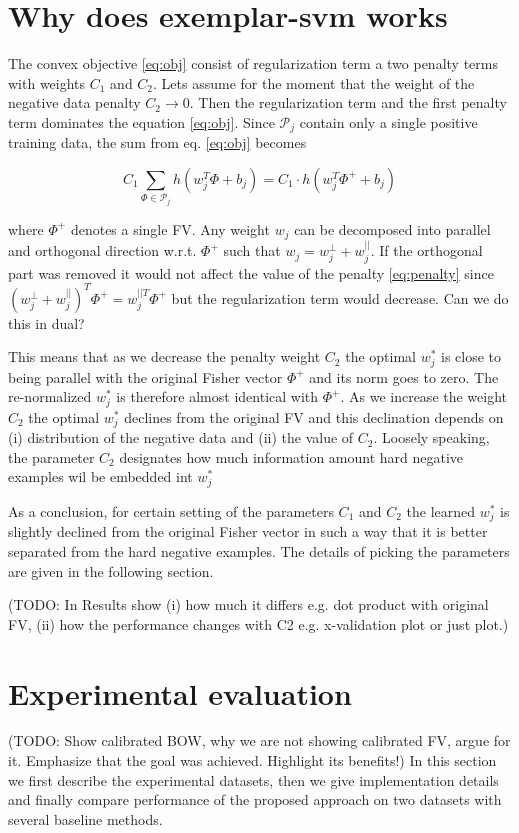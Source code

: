 \documentclass[table]{article} %
\begin{document}
\section{Why does exemplar-svm works}
  	The convex objective \eqref{eq:obj} consist of regularization term a two penalty terms with weights $C_1$ and $C_2$. Lets assume for the moment that the weight of the negative data penalty $C_2 \rightarrow 0$. Then the regularization term and the first penalty term dominates the equation \eqref{eq:obj}. Since $\mathcal P_j$ contain only a single positive training data, the sum from eq. \eqref{eq:obj} becomes

  	\begin{equation}
  		C_1\sum_{\Phi\in \mathcal P_j}h(w_j^T\Phi+b_j)=C_1 \cdot h(w_j^T\Phi^++b_j)
  		\label{eq:penalty}
  	\end{equation}

  	where $\Phi^+$ denotes a single FV. Any weight $w_j$ can be decomposed into parallel and orthogonal direction w.r.t. $\Phi^+$ such that $w_j=w_j^{\perp}+w_j^{||}$. If the orthogonal part was removed it would not affect the value of the penalty \eqref{eq:penalty} since $(w_j^{\perp}+w_j^{||})^T\Phi^+=w_j^{|| T} \Phi^+$ but the regularization term would decrease. \textcolor{myRed}{Can we do this in dual?}

  	This means that as we decrease the penalty weight $C_2$ the optimal $w_j^*$ is close to being parallel with the original Fisher vector $\Phi^+$ and its norm goes to zero. The re-normalized $w_j^*$ is therefore almost identical with $\Phi^+$. As we increase the weight $C_2$ the optimal $w_j^*$ declines from the original FV and this declination depends on (i) distribution of the negative data and (ii) the value of $C_2$. Loosely speaking, the parameter $C_2$ designates how much information amount hard negative examples wil be embedded int $w_j^*$

  	As a conclusion, for certain setting of the parameters $C_1$ and $C_2$ the learned $w_j^*$ is slightly declined from the original Fisher vector in such a way that it is better separated from the hard negative examples. The details of picking the parameters are given in the following section.

  	\textcolor{myRed}{(TODO: In Results show (i) how much it differs e.g. dot product with original FV, (ii) how the performance changes with C2 e.g. x-validation plot or just plot.)}

\section{Experimental evaluation}
\label{sec:exp}
	\textcolor{myRed}{(TODO: Show calibrated BOW, why we are not showing calibrated FV, argue for it. Emphasize that the goal was achieved. Highlight its benefits!)}
	In this section we first describe the experimental datasets, then we give implementation details and finally compare performance of the proposed approach on two datasets with several baseline methods.
\end{document}
